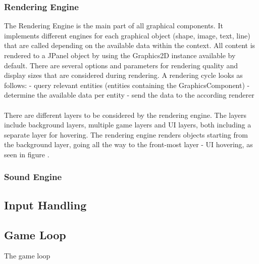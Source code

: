 \subsubsection{Rendering Engine}\label{subsubsec:graphics-engine}
The Rendering Engine is the main part of all graphical components.
It implements different engines for each graphical object (shape, image, text, line) that are called depending on the available data within the
context.
All content is rendered to a JPanel object by using the Graphics2D instance available by default.
There are several options and parameters for rendering quality and display sizes that are considered during rendering.
A rendering cycle looks as follows:
- query relevant entities (entities containing the GraphicsComponent)
- determine the available data per entity
- send the data to the according renderer
\\ \\
There are different layers to be considered by the rendering engine.
The layers include background layers, multiple game layers and UI layers, both including a separate layer for hovering.
The rendering engine renders objects starting from the background layer, going all the way to the front-most layer - UI hovering, as seen in figure
.

\subsubsection{Sound Engine}\label{subsubsec:sound-engine}

\subsection{Input Handling}\label{subsec:input-handling}

\subsection{Game Loop}
The game loop

